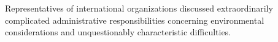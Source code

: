 \hsize=1.6in \parindent=0pt
Representatives of international organizations discussed extraordinarily complicated administrative responsibilities concerning environmental considerations and unquestionably characteristic difficulties.
\bye
